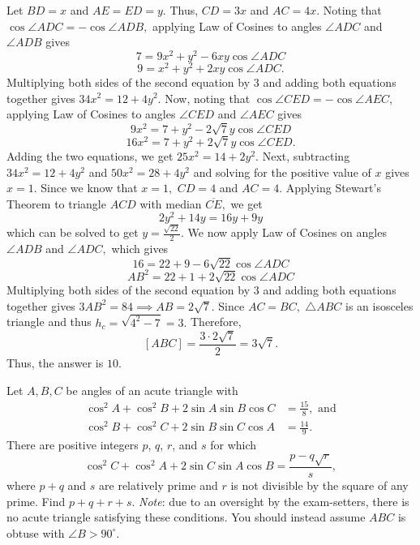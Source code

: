 \documentclass[11pt]{article}
\theoremstyle{definition}
\begin{document}
\begin{solution}[name={Solution by peelybonehead}]
	Let $BD = x$ and $AE = ED = y.$ Thus, $CD = 3x$ and $AC = 4x.$ Noting that $\cos{\angle{ADC}} = -\cos{\angle ADB},$ applying Law of Cosines to angles $\angle ADC$ and $\angle ADB$ gives
	\[7 = 9x^2 + y^2 - 6xy\cos{\angle ADC}\]\[9 = x^2 + y^2 + 2xy\cos{\angle ADC}.\]Multiplying both sides of the second equation by $3$ and adding both equations together gives $34x^2 = 12 + 4y^2.$ Now, noting that $\cos{\angle{CED}} = -\cos{\angle AEC},$ applying Law of Cosines to angles $\angle CED$ and $\angle AEC$ gives
	\[9x^2 = 7 + y^2 - 2\sqrt{7}y\cos{\angle CED}\]\[16x^2 = 7 + y^2 + 2\sqrt{7}y\cos{\angle CED}.\]Adding the two equations, we get $25x^2 = 14 + 2y^2.$	Next, subtracting $34x^2 = 12 + 4y^2$ and $50x^2 = 28 + 4y^2$ and solving for the positive value of $x$ gives $x= 1.$	Since we know that $x=1,$ $CD = 4$ and $AC = 4.$ Applying Stewart's Theorem to triangle $ACD$ with median $\overline{CE},$ we get
	\[2y^2 + 14y = 16y + 9y\]which can be solved to get $y = \frac{\sqrt{22}}{2}.$ We now apply Law of Cosines on angles $\angle ADB$ and $\angle ADC,$ which gives
	\[16 = 22 + 9 - 6\sqrt{22}\cos{\angle ADC}\]\[AB^2 = 22 + 1 + 2\sqrt{22}\cos{\angle ADC}\]Multiplying both sides of the second equation by $3$ and adding both equations together gives $3AB^2 = 84 \implies AB = 2\sqrt{7}.$ Since $AC = BC,$ $\triangle ABC$ is an isosceles triangle and thus $h_c = \sqrt{4^2-7} = 3.$ Therefore,$$[ABC] = \frac{3 \cdot 2\sqrt{7}}{2} = 3\sqrt{7}.$$
	Thus, the answer is $\boxed{10}.$
\end{solution}







\begin{question}[name={2013 AIME II, \href{https://artofproblemsolving.com/community/c4p3003353}{Problem 15}}]
	Let $A,B,C$ be angles of an acute triangle with
	\begin{align*}
		\cos^2 A + \cos^2 B + 2 \sin A \sin B \cos C &= \frac{15}{8}, \text{ and} \\
		\cos^2 B + \cos^2 C + 2 \sin B \sin C \cos A &= \frac{14}{9}.
	\end{align*}There are positive integers $p$, $q$, $r$, and $s$ for which\[ \cos^2 C + \cos^2 A + 2 \sin C \sin A \cos B = \frac{p-q\sqrt{r}}{s}, \]where $p+q$ and $s$ are relatively prime and $r$ is not divisible by the square of any prime. Find $p+q+r+s$. \textit{Note}: due to an oversight by the exam-setters, there is no acute triangle satisfying these conditions. You should instead assume $ABC$ is obtuse with $\angle B > 90^{\circ}$.
\end{question}
\end{document}
